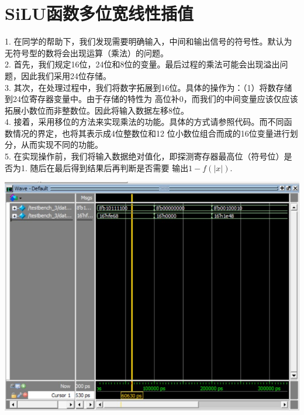 \documentclass[a4paper]{article}
\begin{document}
\section{SiLU函数多位宽线性插值}
1. 在同学的帮助下，我们发现需要明确输入，中间和输出信号的符号性。默认为无符号型的数将会出现运算（乘法）的问题。\\
2. 首先，我们规定16位，24位和8位的变量。最后过程的乘法可能会出现溢出问题，因此我们采用24位存储。\\
3. 其次，在处理过程中，我们将数字拓展到16位。具体的操作为：（1）将数存储到24位寄存器变量中。由于存储的特性为
高位补0，而我们的中间变量应该仅应该拓展小数位而非整数位。因此将输入数据左移8位。\\
4. 接着，采用移位的方法来实现乘法的功能。具体的方式请参照代码。而不同函数情况的界定，也将其表示成4位整数位和12
位小数位组合而成的16位变量进行划分，从而实现不同的功能。\\
5. 在实现操作前，我们将输入数据绝对值化，即探测寄存器最高位（符号位）是否为1. 随后在最后得到结果后再判断是否需要
输出$1-f(\left|x\right|)$.\\
\centerline{\includegraphics[scale=0.8]{silu_adv.jpg}}
\end{document}
